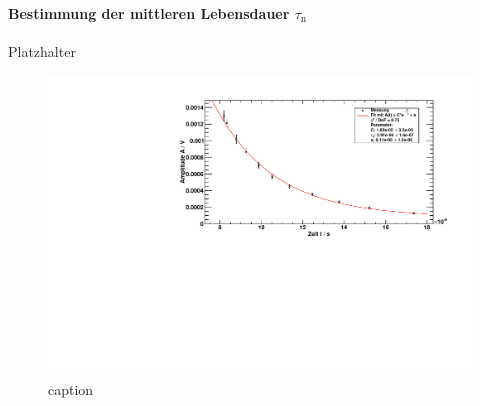 \paragraph{Bestimmung der mittleren Lebensdauer $\tau_\text{n}$}
Platzhalter

\begin{figure}[H]
\begin{center}
  \includegraphics[width=\textwidth]{../img/part2/volt_fitA.pdf}
  \caption{caption}
  \label{img:volt:fita}
\end{center}
\end{figure}